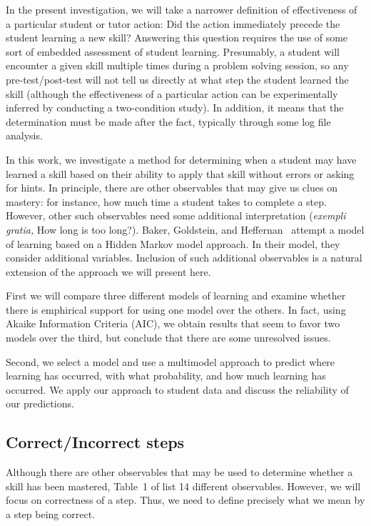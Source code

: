 \documentclass{acmlarge-edm}
\begin{document}
In the present investigation, we will take a narrower definition
of effectiveness of a particular student or tutor action:  
Did the action immediately precede the
student learning a new skill?  Answering this question requires
the use of some sort of embedded assessment of student learning.
Presumably, a student will encounter a given skill multiple times
during a problem solving session, so any pre-test/post-test will
not tell us directly at what step the student learned the skill
(although the effectiveness of a particular action can
be experimentally inferred by conducting a two-condition study).
In addition, it means that the determination must be made
after the fact, typically through some log file analysis. 

In this work, we investigate a method for determining when a student
may have learned a skill based on their ability to apply that skill
without errors or asking for hints.  In principle, there are other
observables that may give us clues on mastery: for instance, how much
time a student takes to complete a step.  However, other such
observables need some additional interpretation ({\em exempli gratia,}
How long is too long?).  Baker, Goldstein, and
Heffernan~\citeyear{baker_detecting_2010} attempt a model of learning
based on a Hidden Markov model approach.  In their model, they
consider additional variables.  Inclusion of such additional
observables is a natural extension of the approach we will present
here.

First we will compare three different models of learning and examine
whether there is emphirical support for using one model over the
others.  In fact, using Akaike Information Criteria (AIC), we obtain
results that seem to favor two models over the third, but conclude
that there are some unresolved issues.

Second, we select a model and use a multimodel approach to predict
where learning has occurred, with what probability, and how much
learning has occurred.  We apply our approach to student data and
discuss the reliability of our predictions.


\subsection{Correct/Incorrect steps}

Although there are other observables that may be used
to determine whether a skill has been mastered, Table~1 of
\cite{baker_detecting_2010} list 14 different observables.  
However, we will focus on correctness of a step.  Thus, we need to
define precisely what we mean by a step being correct.
\end{document}
